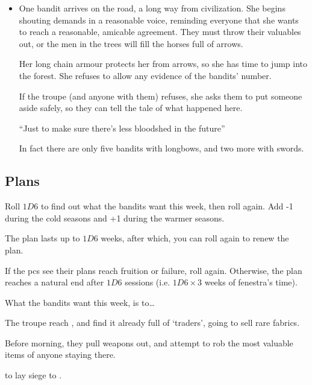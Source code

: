 \begin{multicols}{2}
\showEnc[Hu]

\begin{itemize}
  \item
  One bandit arrives on the road, a long way from civilization.
  She begins shouting demands in a reasonable voice, reminding everyone that she wants to reach a reasonable, amicable agreement.
  They must throw their valuables out, or the men in the trees will fill the horses full of arrows.

  Her long chain armour protects her from arrows, so she has time to jump into the forest.
  She refuses to allow any evidence of the bandits' number.

  If the troupe (and anyone with them) refuses, she asks them to put someone aside safely, so they can tell the tale of what happened here.

  ``Just to make sure there's less bloodshed in the future''

  In fact there are only five bandits with longbows, and two more with swords.
\end{itemize}

\subsection{Plans}

Roll $1D6$ to find out what the bandits want this week, then roll again.
Add -1 during the cold seasons and +1 during the warmer seasons.

The plan lasts up to $1D6$ weeks, after which, you can roll again to renew the plan.

If the \glspl{pc} see their plans reach fruition or failure, roll again.
Otherwise, the plan reaches a natural end after $1D6$ sessions (i.e. $1D6 \times 3$ weeks of \gls{fenestra}'s time).

What the bandits want this week, is to\ldots

\begin{dlistDouble}
  \item
  The troupe reach , and find it already full of `traders', going to sell rare fabrics.

  Before morning, they pull weapons out, and attempt to rob the most valuable items of anyone staying there.
  \item
  to lay siege to .


\end{dlistDouble}
\end{multicols}
